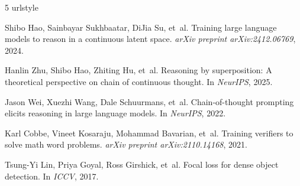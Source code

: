\documentclass{article}
\theoremstyle{compactthm}
\theoremstyle{compactdef}
\begin{document}
\begingroup
\small
\begin{thebibliography}{5}
\providecommand{\natexlab}[1]{#1}
\providecommand{\url}[1]{\texttt{#1}}
\expandafter\ifx\csname urlstyle\endcsname\relax
  \providecommand{\doi}[1]{doi: #1}\else
  \providecommand{\doi}{doi: \begingroup \urlstyle{rm}\Url}\fi

Shibo Hao, Sainbayar Sukhbaatar, DiJia Su, et~al.
\newblock Training large language models to reason in a continuous latent space.
\newblock \emph{arXiv preprint arXiv:2412.06769}, 2024.

Hanlin Zhu, Shibo Hao, Zhiting Hu, et~al.
\newblock Reasoning by superposition: A theoretical perspective on chain of continuous thought.
\newblock In \emph{NeurIPS}, 2025.

Jason Wei, Xuezhi Wang, Dale Schuurmans, et~al.
\newblock Chain-of-thought prompting elicits reasoning in large language models.
\newblock In \emph{NeurIPS}, 2022.

Karl Cobbe, Vineet Kosaraju, Mohammad Bavarian, et~al.
\newblock Training verifiers to solve math word problems.
\newblock \emph{arXiv preprint arXiv:2110.14168}, 2021.

Tsung-Yi Lin, Priya Goyal, Ross Girshick, et~al.
\newblock Focal loss for dense object detection.
\newblock In \emph{ICCV}, 2017.

\end{thebibliography}
\endgroup
\end{document}

